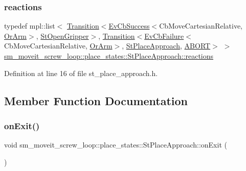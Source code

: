 \subsubsection{\texorpdfstring{reactions}{reactions}}
{\footnotesize\ttfamily typedef mpl\+::list$<$ \hyperlink{classsmacc_1_1Transition}{Transition}$<$\hyperlink{structsmacc_1_1EvCbSuccess}{Ev\+Cb\+Success}$<$Cb\+Move\+Cartesian\+Relative, \hyperlink{classsm__moveit__screw__loop_1_1OrArm}{Or\+Arm}$>$, \hyperlink{structsm__moveit__screw__loop_1_1place__states_1_1StOpenGripper}{St\+Open\+Gripper}$>$, \hyperlink{classsmacc_1_1Transition}{Transition}$<$\hyperlink{structsmacc_1_1EvCbFailure}{Ev\+Cb\+Failure}$<$Cb\+Move\+Cartesian\+Relative, \hyperlink{classsm__moveit__screw__loop_1_1OrArm}{Or\+Arm}$>$, \hyperlink{structsm__moveit__screw__loop_1_1place__states_1_1StPlaceApproach}{St\+Place\+Approach}, \hyperlink{structsmacc_1_1default__transition__tags_1_1ABORT}{A\+B\+O\+RT}$>$ $>$ \hyperlink{structsm__moveit__screw__loop_1_1place__states_1_1StPlaceApproach_a8f513478d2e58f9df846b4ea7ac77075}{sm\+\_\+moveit\+\_\+screw\+\_\+loop\+::place\+\_\+states\+::\+St\+Place\+Approach\+::reactions}}



Definition at line 16 of file st\+\_\+place\+\_\+approach.\+h.



\subsection{Member Function Documentation}
\mbox{\label{structsm__moveit__screw__loop_1_1place__states_1_1StPlaceApproach_ac94125f585769ca06b99107d5a8b4d96}} 
\subsubsection{\texorpdfstring{on\+Exit()}{onExit()}}
{\footnotesize\ttfamily void sm\+\_\+moveit\+\_\+screw\+\_\+loop\+::place\+\_\+states\+::\+St\+Place\+Approach\+::on\+Exit (\begin{DoxyParamCaption}{ }\end{DoxyParamCaption})\hspace{0.3cm}{\ttfamily [inline]}}



